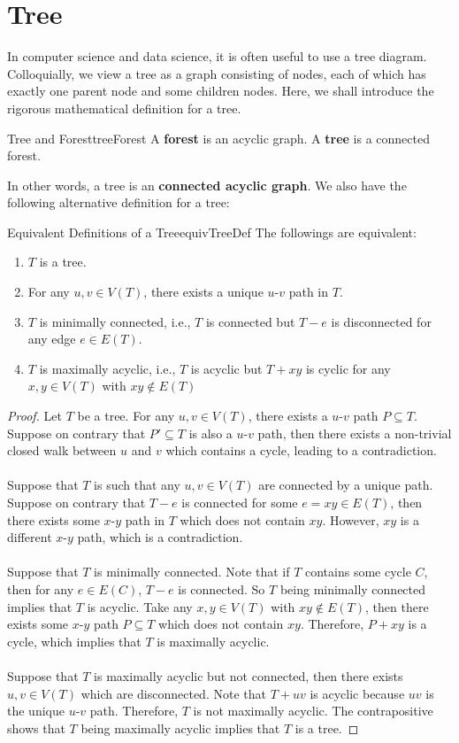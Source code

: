 \documentclass[math]{amznotes}
\theoremstyle{remark}
\begin{document}
\section{Tree}
In computer science and data science, it is often useful to use a tree diagram. Colloquially, we view a tree as a graph consisting of nodes, each of which has exactly one parent node and some children nodes. Here, we shall introduce the rigorous mathematical definition for a tree.
\begin{dfnbox}{Tree and Forest}{treeForest}
    A {\color{red} \textbf{forest}} is an acyclic graph. A {\color{red} \textbf{tree}} is a connected forest.
\end{dfnbox}
In other words, a tree is an \textbf{connected acyclic graph}. We also have the following alternative definition for a tree:
\begin{thmbox}{Equivalent Definitions of a Tree}{equivTreeDef}
    The followings are equivalent:
    \begin{enumerate}
        \item $T$ is a tree.
        \item For any $u, v \in V(T)$, there exists a unique $u$-$v$ path in $T$.
        \item $T$ is minimally connected, i.e., $T$ is connected but $T - e$ is disconnected for any edge $e \in E(T)$.
        \item $T$ is maximally acyclic, i.e., $T$ is acyclic but $T + xy$ is cyclic for any $x, y \in V(T)$ with $xy \notin E(T)$ 
    \end{enumerate}
    \tcblower
    \begin{proof}
        Let $T$ be a tree. For any $u, v \in V(T)$, there exists a $u$-$v$ path $P \subseteq T$. Suppose on contrary that $P' \subseteq T$ is also a $u$-$v$ path, then there exists a non-trivial closed walk between $u$ and $v$ which contains a cycle, leading to a contradiction.
        \\\\
        Suppose that $T$ is such that any $u, v \in V(T)$ are connected by a unique path. Suppose on contrary that $T - e$ is connected for some $e = xy \in E(T)$, then there exists some $x$-$y$ path in $T$ which does not contain $xy$. However, $xy$ is a different $x$-$y$ path, which is a contradiction.
        \\\\
        Suppose that $T$ is minimally connected. Note that if $T$ contains some cycle $C$, then for any $e \in E(C)$, $T - e$ is connected. So $T$ being minimally connected implies that $T$ is acyclic. Take any $x, y \in V(T)$ with $xy \notin E(T)$, then there exists some $x$-$y$ path $P \subseteq T$ which does not contain $xy$. Therefore, $P + xy$ is a cycle, which implies that $T$ is maximally acyclic.
        \\\\
        Suppose that $T$ is maximally acyclic but not connected, then there exists $u, v \in V(T)$ which are disconnected. Note that $T + uv$ is acyclic because $uv$ is the unique $u$-$v$ path. Therefore, $T$ is not maximally acyclic. The contrapositive shows that $T$ being maximally acyclic implies that $T$ is a tree.
    \end{proof}
\end{thmbox}
\end{document}
